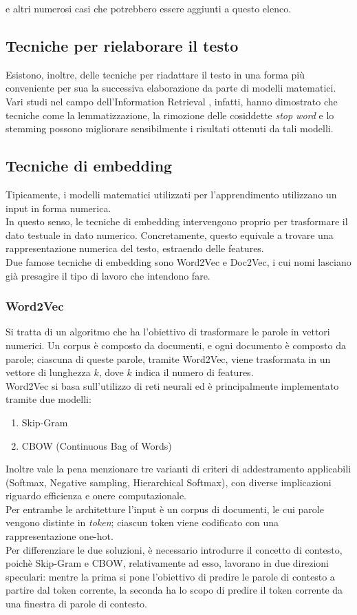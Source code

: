 \documentclass[12pt]{report}
\theoremstyle{definition}
\begin{document}
e altri numerosi casi che potrebbero essere aggiunti a questo elenco.
\subsection{Tecniche per rielaborare il testo}
Esistono, inoltre, delle tecniche per riadattare il testo in una forma più conveniente per sua la successiva elaborazione da parte di modelli matematici.
\\
Vari studi nel campo dell'Information Retrieval \cite{22}, infatti, hanno dimostrato che tecniche come la lemmatizzazione, la rimozione delle cosiddette \textit{stop word} e lo stemming possono migliorare sensibilmente i risultati ottenuti da tali modelli.

\subsection{Tecniche di embedding} \label{embedding}
Tipicamente, i modelli matematici utilizzati per l'apprendimento utilizzano un input in forma numerica.
\\
In questo senso, le tecniche di embedding intervengono proprio per trasformare il dato testuale in dato numerico.
Concretamente, questo equivale a trovare una rappresentazione numerica del testo, estraendo delle features.
\\
Due famose tecniche di embedding sono Word2Vec e Doc2Vec, i cui nomi lasciano già presagire il tipo di lavoro che intendono fare.
\subsubsection{Word2Vec} \label{w2v}
Si tratta di un algoritmo che ha l'obiettivo di trasformare le parole in vettori numerici.
Un corpus è composto da documenti, e ogni documento è composto da parole; ciascuna di queste parole, tramite Word2Vec, viene trasformata in un vettore di lunghezza $k$, dove $k$ indica il numero di features. 
\\
Word2Vec si basa sull'utilizzo di reti neurali \cite{3} ed è principalmente implementato tramite due modelli:
\begin{enumerate}
    \item Skip-Gram
    \item CBOW (Continuous Bag of Words)
\end{enumerate}

Inoltre vale la pena menzionare tre varianti di criteri di addestramento applicabili (Softmax, Negative sampling, Hierarchical Softmax), con diverse implicazioni riguardo efficienza e onere computazionale.
\\
Per entrambe le architetture l'input è un corpus di documenti, le cui parole vengono distinte in \textit{token}; ciascun token viene codificato con una rappresentazione one-hot.
\\
Per differenziare le due soluzioni, è necessario introdurre il concetto di contesto, poichè Skip-Gram e CBOW, relativamente ad esso, lavorano in due direzioni speculari:
mentre la prima si pone l'obiettivo di predire le parole di contesto a partire dal token corrente, la seconda ha lo scopo di predire il token corrente da una finestra di parole di contesto.
\end{document}
